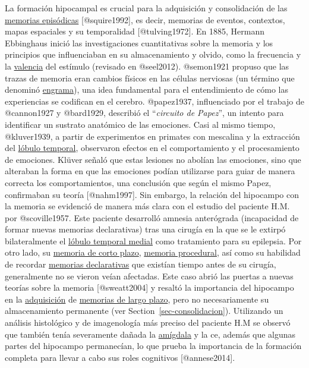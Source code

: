 \documentclass[
  11pt]{../MastersDoctoralThesisUNAM}
\begin{document}
La formación hipocampal es crucial para la adquisición y consolidación
de las \href{AppendixB.qmd\#term-id-2}{memorias episódicas}
{[}@squire1992{]}, es decir, memorias de eventos, contextos, mapas
espaciales y su temporalidad {[}@tulving1972{]}. En 1885, Hermann
Ebbinghaus inició las investigaciones cuantitativas sobre la memoria y
los principios que influenciaban en su almacenamiento y olvido, como la
frecuencia y la \href{AppendixB.qmd\#term-id-58}{valencia} del estímulo
(revisado en @seel2012). @semon1921 propuso que las trazas de memoria
eran cambios físicos en las células nerviosas (un término que denominó
\href{AppendixB.qmd\#term-id-1}{engrama}), una idea fundamental para el
entendimiento de cómo las experiencias se codifican en el cerebro.
@papez1937, influenciado por el trabajo de @cannon1927 y @bard1929,
describió el ``\emph{circuito de Papez}'', un intento para identificar
un sustrato anatómico de las emociones. Casi al mismo tiempo,
@kluver1939, a partir de experimentos en primates con mescalina y la
extracción del \href{AppendixB.qmd\#term-id-59}{lóbulo temporal},
observaron efectos en el comportamiento y el procesamiento de emociones.
Klüver señaló que estas lesiones no abolían las emociones, sino que
alteraban la forma en que las emociones podían utilizarse para guiar de
manera correcta los comportamientos, una conclusión que según el mismo
Papez, confirmaban su teoría {[}@nahm1997{]}. Sin embargo, la relación
del hipocampo con la memoria se evidenció de manera más clara con el
estudio del paciente H.M. por @scoville1957. Este paciente desarrolló
amnesia anterógrada (incapacidad de formar nuevas memorias declarativas)
tras una cirugía en la que se le extirpó bilateralmente el
\href{AppendixB.qmd\#term-id-59}{lóbulo temporal medial} como
tratamiento para su epilepsia. Por otro lado, su
\href{AppendixB.qmd\#term-id-4}{memoria de corto plazo},
\href{AppendixB.qmd\#term-id-60}{memoria procedural}, así como su
habilidad de recordar \href{AppendixB.qmd\#term-id-6}{memorias
declarativas} que existían tiempo antes de su cirugía,
\colorbox{BurntOrange}{generalmente no se vieron veían afectadas}. Este
caso abrió las puertas a nuevas teorías sobre la memoria
{[}@sweatt2004{]} y resaltó la importancia del hipocampo en la
\href{AppendixB.qmd\#term-id-9}{adquisición} de
\href{AppendixB.qmd\#term-id-5}{memorias de largo plazo}, pero no
necesariamente su almacenamiento permanente (ver
Section~\ref{sec-consolidacion}). Utilizando un análisis histológico y
de imagenología más preciso del paciente H.M se observó que también
tenía severamente dañada la \href{AppendixB.qmd\#term-id-13}{amígdala} y
la \ac{ce}, además que algunas partes del hipocampo permanecían, lo que
prueba la importancia de la formación completa para llevar a cabo sus
roles cognitivos {[}@annese2014{]}.
\end{document}
